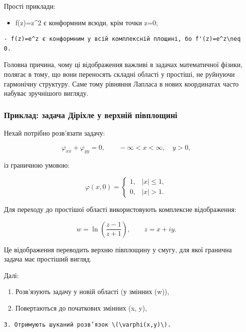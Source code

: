 \documentclass[
  ukrainian,
]{article}
\providecommand{\tightlist}{%
  \setlength{\itemsep}{0pt}\setlength{\parskip}{0pt}}
\begin{document}
Прості приклади:

\begin{itemize}
\tightlist
\item
  f(z)=z\^{}2 є конформним всюди, крім точки z=0;
\end{itemize}

\begin{verbatim}
- f(z)=e^z є конформним у всій комплексній площині, бо f'(z)=e^z\neq 0.
\end{verbatim}

Головна причина, чому ці відображення важливі в задачах математичної
фізики, полягає в тому, що вони переносять складні області у простіші,
не руйнуючи гармонічну структуру. Саме тому рівняння Лапласа в нових
координатах часто набуває зручнішого вигляду.

\subsubsection{Приклад: задача Діріхле у верхній
півплощині}\label{ux43fux440ux438ux43aux43bux430ux434-ux437ux430ux434ux430ux447ux430-ux434ux456ux440ux456ux445ux43bux435-ux443-ux432ux435ux440ux445ux43dux456ux439-ux43fux456ux432ux43fux43bux43eux449ux438ux43dux456}

Нехай потрібно розв'язати задачу:

\[
\varphi_{xx} + \varphi_{yy} = 0, \qquad -\infty < x < \infty,\quad y > 0,
\]

із граничною умовою:

\[
\varphi(x,0) =
\begin{cases}
1, & |x| \le 1, \\
0, & |x| > 1.
\end{cases}
\]

Для переходу до простішої області використовують комплексне
відображення:

\[
w = \ln\!\left(\frac{z - 1}{z + 1}\right), \qquad z = x + iy.
\]

Це відображення переводить верхню півплощину у смугу, для якої гранична
задача має простіший вигляд.

Далі:

\begin{enumerate}
\def\labelenumi{\arabic{enumi}.}
\item
  Розв'язують задачу у новій області (у змінних (w)),
\item
  Повертаються до початкових змінних (x, y),
\end{enumerate}

\begin{verbatim}
3. Отримують шуканий розв’язок \(\varphi(x,y)\).
\end{verbatim}
\end{document}
